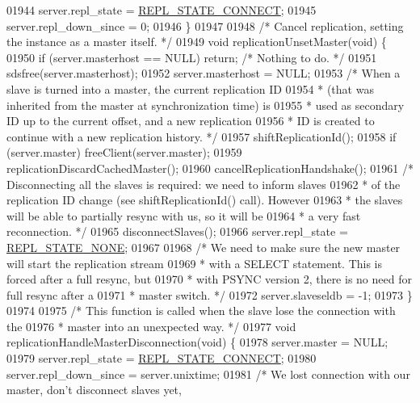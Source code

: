 \begin{DoxyCode}
{{{{{{{{{{{{{{{{{{{{{{{{{{{{{{{{{{{{{{{{{{{{{{{{{{{{{{{{{{{{{{{{{{{{{{{01944     server.repl\_state = \hyperlink{server_8h_adfe013d4a620f0b98b47b2144760e69f}{REPL\_STATE\_CONNECT};
01945     server.repl\_down\_since = 0;
01946 \}
01947 
01948 \textcolor{comment}{/* Cancel replication, setting the instance as a master itself. */}
01949 \textcolor{keywordtype}{void} replicationUnsetMaster(\textcolor{keywordtype}{void}) \{
01950     \textcolor{keywordflow}{if} (server.masterhost == NULL) \textcolor{keywordflow}{return}; \textcolor{comment}{/* Nothing to do. */}
01951     sdsfree(server.masterhost);
01952     server.masterhost = NULL;
01953     \textcolor{comment}{/* When a slave is turned into a master, the current replication ID}
01954 \textcolor{comment}{     * (that was inherited from the master at synchronization time) is}
01955 \textcolor{comment}{     * used as secondary ID up to the current offset, and a new replication}
01956 \textcolor{comment}{     * ID is created to continue with a new replication history. */}
01957     shiftReplicationId();
01958     \textcolor{keywordflow}{if} (server.master) freeClient(server.master);
01959     replicationDiscardCachedMaster();
01960     cancelReplicationHandshake();
01961     \textcolor{comment}{/* Disconnecting all the slaves is required: we need to inform slaves}
01962 \textcolor{comment}{     * of the replication ID change (see shiftReplicationId() call). However}
01963 \textcolor{comment}{     * the slaves will be able to partially resync with us, so it will be}
01964 \textcolor{comment}{     * a very fast reconnection. */}
01965     disconnectSlaves();
01966     server.repl\_state = \hyperlink{server_8h_a256b9506e551eaa7417f75f8fa9ed901}{REPL\_STATE\_NONE};
01967 
01968     \textcolor{comment}{/* We need to make sure the new master will start the replication stream}
01969 \textcolor{comment}{     * with a SELECT statement. This is forced after a full resync, but}
01970 \textcolor{comment}{     * with PSYNC version 2, there is no need for full resync after a}
01971 \textcolor{comment}{     * master switch. */}
01972     server.slaveseldb = -1;
01973 \}
01974 
01975 \textcolor{comment}{/* This function is called when the slave lose the connection with the}
01976 \textcolor{comment}{ * master into an unexpected way. */}
01977 \textcolor{keywordtype}{void} replicationHandleMasterDisconnection(\textcolor{keywordtype}{void}) \{
01978     server.master = NULL;
01979     server.repl\_state = \hyperlink{server_8h_adfe013d4a620f0b98b47b2144760e69f}{REPL\_STATE\_CONNECT};
01980     server.repl\_down\_since = server.unixtime;
01981     \textcolor{comment}{/* We lost connection with our master, don't disconnect slaves yet,}
}}}}}}}}}}}}}}}}}}}}}}}}}}}}}}}}}}}}}}}}}}}}}}}}}}}}}}}}}}}}}}}}}}}}}}}
\end{DoxyCode}
